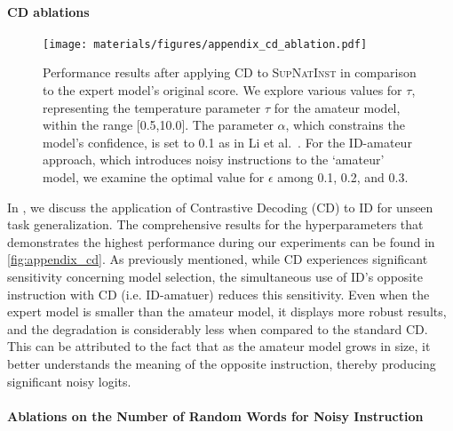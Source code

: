 \paragraph{CD ablations}
\begin{figure}
\centering
\texttt{[image: materials/figures/appendix\_cd\_ablation.pdf]}
\caption{Performance results after applying CD to \textsc{SupNatInst} in comparison to the expert model's original score. We explore various values for \(\tau\), representing the temperature parameter $\tau$ for the amateur model, within the range [0.5,10.0]. The parameter \(\alpha\), which constrains the model's confidence, is set to 0.1 as in Li et al. \,\citep{contrastive_decoding}. For the ID-amateur approach, which introduces noisy instructions to the `amateur' model, we examine the optimal value for \(\epsilon\) among 0.1, 0.2, and 0.3.}
\label{fig:appendix_cd}
\end{figure}

In , we discuss the application of Contrastive Decoding (CD) to ID for unseen task generalization. The comprehensive results for the hyperparameters that demonstrates the highest performance during our experiments can be found in \autoref{fig:appendix_cd}. As previously mentioned, while CD experiences significant sensitivity concerning model selection, the simultaneous use of ID's opposite instruction with CD (i.e. ID-amatuer) reduces this sensitivity. Even when the expert model is smaller than the amateur model, it displays more robust results, and the degradation is considerably less when compared to the standard CD. This can be attributed to the fact that as the amateur model grows in size, it better understands the meaning of the opposite instruction, thereby producing significant noisy logits.




\paragraph{Ablations on the Number of Random Words for Noisy Instruction}



